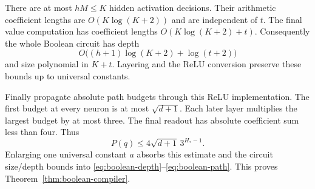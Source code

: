 There are at most $hM\le K$ hidden activation decisions. Their arithmetic coefficient lengths are $O(K\log(K+2))$ and are independent of $t$. The final value computation has coefficient lengths $O(K\log(K+2)+t)$. Consequently the whole Boolean circuit has depth
\[
 O\bigl((h+1)\log(K+2)+\log(t+2)\bigr)
\]
and size polynomial in $K+t$. Layering and the ReLU conversion preserve these bounds up to universal constants.

Finally propagate absolute path budgets through this ReLU implementation. The first budget at every neuron is at most $\sqrt{d+1}$. Each later layer multiplies the largest budget by at most three. The final readout has absolute coefficient sum less than four. Thus
\[
 P(q)\le4\sqrt{d+1}\,3^{H_*-1}.
\]
Enlarging one universal constant $a$ absorbs this estimate and the circuit size/depth bounds into \eqref{eq:boolean-depth}--\eqref{eq:boolean-path}. This proves Theorem~\ref{thm:boolean-compiler}.
